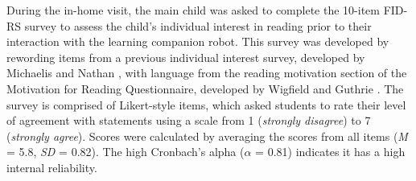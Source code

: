\documentclass{sigchi}
\begin{document}
During the in-home visit, the main child was asked to complete the 10-item FID-RS survey to assess the child's individual interest in reading prior to their interaction with the learning companion robot. This survey was developed by rewording items from a previous individual interest survey, developed by Michaelis and Nathan \cite{Michaelis:2015}, with language from the reading motivation section of the Motivation for Reading Questionnaire, developed by Wigfield and Guthrie \cite{Wigfield:1997}. The survey is comprised of Likert-style items, which asked students to rate their level of agreement with statements using a scale from 1 (\textit{strongly disagree}) to 7 (\textit{strongly agree}). Scores were calculated by averaging the scores from all items (\textit{M} = 5.8, \textit{SD} = 0.82). The high Cronbach's alpha ($\alpha$ = 0.81) indicates it has a high internal reliability.
 


\end{document}
